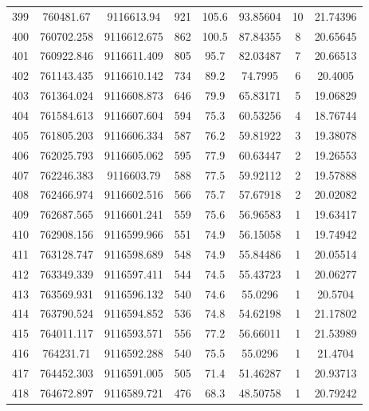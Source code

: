 \begin{longtable}{cccccccc}
399  & 760481.67       & 9116613.94       & 921     & 105.6 & 93.85604 & 10 & 21.74396 \\
400  & 760702.258      & 9116612.675      & 862     & 100.5 & 87.84355 & 8  & 20.65645 \\
401  & 760922.846      & 9116611.409      & 805     & 95.7  & 82.03487 & 7  & 20.66513 \\
402  & 761143.435      & 9116610.142      & 734     & 89.2  & 74.7995  & 6  & 20.4005  \\
403  & 761364.024      & 9116608.873      & 646     & 79.9  & 65.83171 & 5  & 19.06829 \\
404  & 761584.613      & 9116607.604      & 594     & 75.3  & 60.53256 & 4  & 18.76744 \\
405  & 761805.203      & 9116606.334      & 587     & 76.2  & 59.81922 & 3  & 19.38078 \\
406  & 762025.793      & 9116605.062      & 595     & 77.9  & 60.63447 & 2  & 19.26553 \\
407  & 762246.383      & 9116603.79       & 588     & 77.5  & 59.92112 & 2  & 19.57888 \\
408  & 762466.974      & 9116602.516      & 566     & 75.7  & 57.67918 & 2  & 20.02082 \\
409  & 762687.565      & 9116601.241      & 559     & 75.6  & 56.96583 & 1  & 19.63417 \\
410  & 762908.156      & 9116599.966      & 551     & 74.9  & 56.15058 & 1  & 19.74942 \\
411  & 763128.747      & 9116598.689      & 548     & 74.9  & 55.84486 & 1  & 20.05514 \\
412  & 763349.339      & 9116597.411      & 544     & 74.5  & 55.43723 & 1  & 20.06277 \\
413  & 763569.931      & 9116596.132      & 540     & 74.6  & 55.0296  & 1  & 20.5704  \\
414  & 763790.524      & 9116594.852      & 536     & 74.8  & 54.62198 & 1  & 21.17802 \\
415  & 764011.117      & 9116593.571      & 556     & 77.2  & 56.66011 & 1  & 21.53989 \\
416  & 764231.71       & 9116592.288      & 540     & 75.5  & 55.0296  & 1  & 21.4704  \\
417  & 764452.303      & 9116591.005      & 505     & 71.4  & 51.46287 & 1  & 20.93713 \\
418  & 764672.897      & 9116589.721      & 476     & 68.3  & 48.50758 & 1  & 20.79242 \\

\end{longtable}
